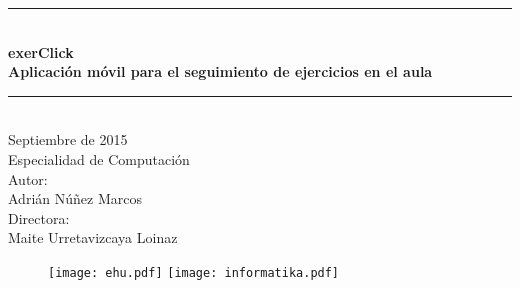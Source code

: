 \pagestyle{empty}

\newcommand{\HRule}{\rule{\linewidth}{0.5mm}} 

\begin{center}
	\HRule \\[0.5cm]
	\vspace{0.5cm}
	\textbf {
		{\huge exerClick}\\
		\vspace{0.3 cm}
		Aplicación móvil para el seguimiento de ejercicios en el aula\\
	}
	\vspace{0.5cm}
	\HRule \\[2.0cm]
	{\large
		Septiembre de 2015\\
		\vspace{2.0 cm}
		Especialidad de Computación\\
		\vspace{2.0 cm}
		Autor:\\
		Adrián Núñez Marcos\\
		\vspace{1.0 cm}
		Directora:\\
		Maite Urretavizcaya Loinaz\\
	}

	\vspace{2.0 cm} 
	\begin{figure}[h!]
		\centering
		\texttt{[image: ehu.pdf]}\hfill
		\texttt{[image: informatika.pdf]}
	\end{figure}
\end{center}